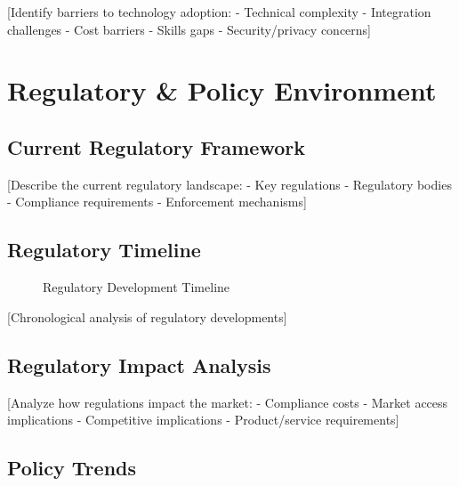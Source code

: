 \documentclass[11pt,letterpaper]{report}
\begin{document}
[Identify barriers to technology adoption:
- Technical complexity
- Integration challenges
- Cost barriers
- Skills gaps
- Security/privacy concerns]

\chapter{Regulatory \& Policy Environment}

\section{Current Regulatory Framework}

[Describe the current regulatory landscape:
- Key regulations
- Regulatory bodies
- Compliance requirements
- Enforcement mechanisms]

\section{Regulatory Timeline}


\begin{figure}[htbp]
\centering
\caption{Regulatory Development Timeline}
\label{fig:regulatory_timeline}
\end{figure}

[Chronological analysis of regulatory developments]

\section{Regulatory Impact Analysis}

[Analyze how regulations impact the market:
- Compliance costs
- Market access implications
- Competitive implications
- Product/service requirements]

\section{Policy Trends}
\end{document}
